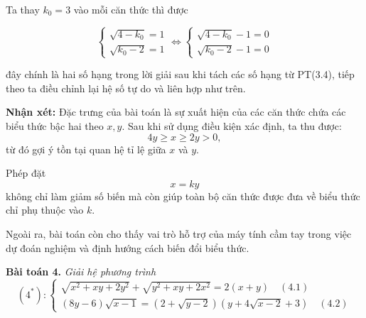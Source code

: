 \documentclass[12pt]{report}
\begin{document}
\vspace{0.3cm}
\noindent Ta thay $k_0 = 3$ vào mỗi căn thức thì được

\[
\begin{cases}
\sqrt{4 - k_0} = 1 \\
\sqrt{k_0 - 2} = 1
\end{cases}
\Leftrightarrow
\begin{cases}
\sqrt{4 - k_0} - 1 = 0 \\
\sqrt{k_0 - 2} - 1 = 0
\end{cases}
\]

\noindent đây chính là hai số hạng trong lời giải sau khi tách các số hạng từ PT(3.4), tiếp theo ta điều chỉnh lại hệ số tự do và liên hợp như trên.

\vspace{0.3cm}
\noindent \textbf{Nhận xét:} Đặc trưng của bài toán là sự xuất hiện của các căn thức chứa các biểu thức bậc hai theo $x, y$. Sau khi sử dụng điều kiện xác định, ta thu được:
\[
4y \geq x \geq 2y > 0,
\]
từ đó gợi ý tồn tại quan hệ tỉ lệ giữa $x$ và $y$.

\noindent Phép đặt
\[
x = ky
\]
không chỉ làm giảm số biến mà còn giúp toàn bộ căn thức được đưa về biểu thức chỉ phụ thuộc vào $k$.

\vspace{0.2cm}
\noindent Ngoài ra, bài toán còn cho thấy vai trò hỗ trợ của máy tính cầm tay trong việc dự đoán nghiệm và định hướng cách biến đổi biểu thức.

\vspace{0.4cm}
\noindent \textbf{Bài toán 4.} \textit{Giải hệ phương trình}
\[
(4^*): \begin{cases}
\sqrt{x^2 + xy + 2y^2} + \sqrt{y^2 + xy + 2x^2} = 2(x + y) \quad (4.1) \\
(8y - 6)\sqrt{x - 1} = (2 + \sqrt{y - 2})(y + 4\sqrt{x - 2} + 3) \quad (4.2)
\end{cases}
\]
\end{document}
